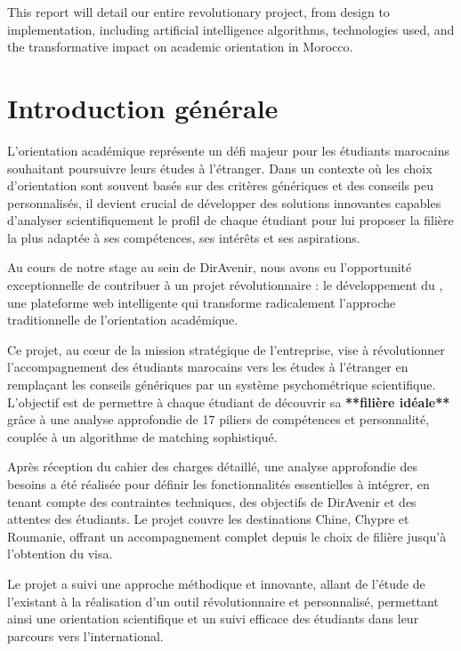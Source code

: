 \documentclass[12pt,a4paper]{report}
\begin{document}
This report will detail our entire revolutionary project, from design to implementation, including artificial intelligence algorithms, technologies used, and the transformative impact on academic orientation in Morocco.
\newpage
\section*{Introduction générale}

L'orientation académique représente un défi majeur pour les étudiants marocains souhaitant poursuivre leurs études à l'étranger. Dans un contexte où les choix d'orientation sont souvent basés sur des critères génériques et des conseils peu personnalisés, il devient crucial de développer des solutions innovantes capables d'analyser scientifiquement le profil de chaque étudiant pour lui proposer la filière la plus adaptée à ses compétences, ses intérêts et ses aspirations.

Au cours de notre stage au sein de DirAvenir, nous avons eu l'opportunité exceptionnelle de contribuer à un projet révolutionnaire : le développement du \textbf{}, une plateforme web intelligente qui transforme radicalement l'approche traditionnelle de l'orientation académique.

Ce projet, au cœur de la mission stratégique de l'entreprise, vise à révolutionner l'accompagnement des étudiants marocains vers les études à l'étranger en remplaçant les conseils génériques par un système psychométrique scientifique. L'objectif est de permettre à chaque étudiant de découvrir sa \textbf{**filière idéale**} grâce à une analyse approfondie de 17 piliers de compétences et personnalité, couplée à un algorithme de matching sophistiqué.

Après réception du cahier des charges détaillé, une analyse approfondie des besoins a été réalisée pour définir les fonctionnalités essentielles à intégrer, en tenant compte des contraintes techniques, des objectifs de DirAvenir et des attentes des étudiants. Le projet couvre les destinations Chine, Chypre et Roumanie, offrant un accompagnement complet depuis le choix de filière jusqu'à l'obtention du visa.

Le projet a suivi une approche méthodique et innovante, allant de l'étude de l'existant à la réalisation d'un outil révolutionnaire et personnalisé, permettant ainsi une orientation scientifique et un suivi efficace des étudiants dans leur parcours vers l'international.
\end{document}
